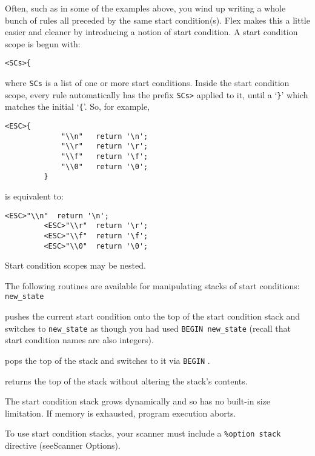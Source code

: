 \documentclass[openany,oneside]{book}
\begin{document}
Often, such as in some of the examples above, you wind up writing a
whole bunch of rules all preceded by the same start condition(s).  Flex
makes this a little easier and cleaner by introducing a notion of start
condition.  A start condition scope is begun with:
\begin{verbatim}
<SCs>{
\end{verbatim}


where \verb`SCs` is a list of one or more start conditions.  Inside the
start condition scope, every rule automatically has the prefix \verb`SCs>` applied to it, until a ‘\verb`}`’ which matches the initial
‘\verb`{`’.  So, for example,


\begin{verbatim}
<ESC>{
             "\\n"   return '\n';
             "\\r"   return '\r';
             "\\f"   return '\f';
             "\\0"   return '\0';
         }
\end{verbatim}


is equivalent to:
\begin{verbatim}
<ESC>"\\n"  return '\n';
         <ESC>"\\r"  return '\r';
         <ESC>"\\f"  return '\f';
         <ESC>"\\0"  return '\0';
\end{verbatim}


Start condition scopes may be nested.

The following routines are available for manipulating stacks of start conditions: \verb`new_state` 

pushes the current start condition onto the top of the start condition
stack and switches to \verb`new_state` as though you had used \verb`BEGIN new_state` (recall that start condition names are also integers).

pops the top of the stack and switches to it via \verb`BEGIN` .

returns the top of the stack without altering the stack's contents.

The start condition stack grows dynamically and so has no built-in size
limitation.  If memory is exhausted, program execution aborts.

To use start condition stacks, your scanner must include a \verb`%option stack` directive (seeScanner Options).
\end{document}
